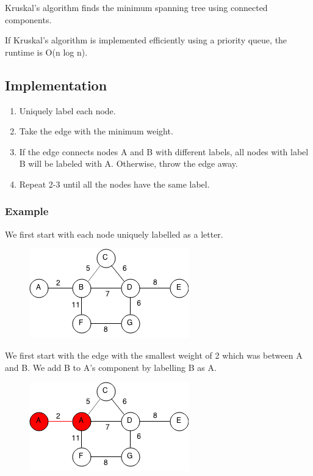 \documentclass[11pt,oneside]{book}
\makeatletter
\def\maxwidth#1{\ifdim\Gin@nat@width>#1 #1\else\Gin@nat@width\fi}
\makeatother
\begin{document}
Kruskal's algorithm finds the minimum spanning tree using connected components.

If Kruskal's algorithm is implemented efficiently using a priority queue, the runtime is O(n log n).

\subsection{Implementation}

\begin{enumerate}
\item Uniquely label each node.
\item Take the edge with the minimum weight.
\item If the edge connects nodes A and B with different labels, all nodes with label B will be labeled with A. Otherwise, throw the edge away.
\item Repeat 2-3 until all the nodes have the same label.
\end{enumerate}

\subsubsection{Example}

We first start with each node uniquely labelled as a letter.

\vspace{5px}\begin{figure}[H]\centering
        \includegraphics[width=0.66\maxwidth{\textwidth}]{kruskal.png}
        \end{figure}

We first start with the edge with the smallest weight of 2 which was between A and B. We add B to A's component by labelling B as A.

\vspace{5px}\begin{figure}[H]\centering
        \includegraphics[width=0.66\maxwidth{\textwidth}]{kruskal2.png}
        \end{figure}
\end{document}
